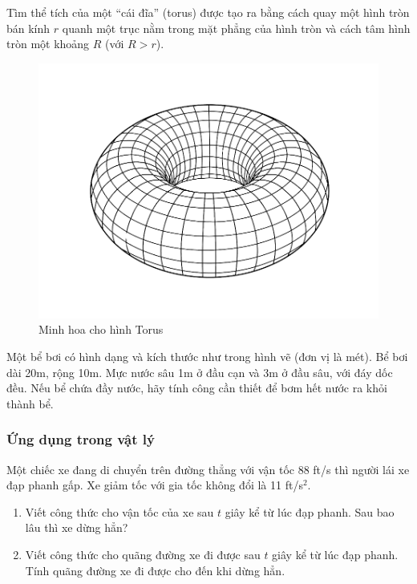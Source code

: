 \begin{exercise}
    Tìm thể tích của một ``cái đĩa'' (torus) được tạo ra bằng cách quay một hình tròn bán kính $r$ quanh một trục nằm trong mặt phẳng của hình tròn và cách tâm hình tròn một khoảng $R$ (với $R > r$).

    \begin{figure}
        \centering
        \includegraphics[width=0.6\linewidth]{figures/torus.png}
        \caption{Minh hoa cho hình Torus}
        \label{fig:torus}
    \end{figure}
    
\end{exercise}

\begin{exercise}
    Một bể bơi có hình dạng và kích thước như trong hình vẽ (đơn vị là mét). Bể bơi dài 20m, rộng 10m. Mực nước sâu 1m ở đầu cạn và 3m ở đầu sâu, với đáy dốc đều. Nếu bể chứa đầy nước, hãy tính công cần thiết để bơm hết nước ra khỏi thành bể.
\end{exercise}

\subsubsection{Ứng dụng trong vật lý}

\begin{exercise}
    Một chiếc xe đang di chuyển trên đường thẳng với vận tốc 88 ft/s thì người lái xe đạp phanh gấp. Xe giảm tốc với gia tốc không đổi là 11 ft/s$^2$.
    \begin{enumerate}[label=(\alph*)]
        \item Viết công thức cho vận tốc của xe sau $t$ giây kể từ lúc đạp phanh. Sau bao lâu thì xe dừng hẳn?
        \item Viết công thức cho quãng đường xe đi được sau $t$ giây kể từ lúc đạp phanh. Tính quãng đường xe đi được cho đến khi dừng hẳn.
    \end{enumerate}
\end{exercise}

